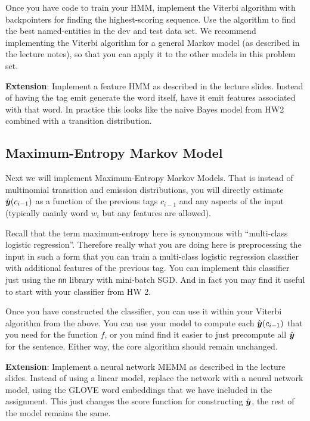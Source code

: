 \documentclass[11pt]{article}
\begin{document}
Once you have code to train your HMM, implement the Viterbi algorithm
with backpointers for finding the highest-scoring sequence. Use the
algorithm to find the best named-entities in the dev and test data
set. We recommend implementing the Viterbi algorithm for a general 
Markov model (as described in the lecture notes), so that you can 
apply it to the other models in this problem set. 

\textbf{Extension}: Implement a feature HMM as described in the
lecture slides. Instead of having the tag emit generate the word
itself, have it emit features associated with that word. In practice
this looks like the naive Bayes model from HW2 combined with a
transition distribution.


\subsection{Maximum-Entropy Markov Model}

Next we will implement Maximum-Entropy Markov Models. That is instead
of multinomial transition and emission distributions, you will
directly estimate $\hat{\boldsymbol{y}}(c_{i-1})$ as a function of the
previous tags $c_{i-1}$ and any aspects of the input (typically mainly
word $w_{i}$ but any features are allowed). 

Recall that the term maximum-entropy here is synonymous with
``multi-class logistic regression''. Therefore really what you are
doing here is preprocessing the input in such a form that you can
train a multi-class logistic regression classifier with additional
features of the previous tag. You can implement this classifier just 
using the \texttt{nn} library with mini-batch SGD. And in fact 
you may find it useful to start with your classifier from HW 2.

Once you have constructed the classifier, you can use it within your
Viterbi algorithm from the above. You can use your model to compute
each $\hat{\boldsymbol{y}}(c_{i-1})$ that you need for the function $f$, or
you mind find it easier to just precompute all $\hat{\boldsymbol{y}}$ for the 
sentence. Either way, the core algorithm should remain unchanged. 


\textbf{Extension}: Implement a neural network MEMM as described in
the lecture slides. Instead of using a linear model, replace the
network with a neural network model, using the GLOVE word embeddings
that we have included in the assignment. This just changes the score
function for constructing $\hat{\boldsymbol{y}}$, the rest of the model
remains the same.
\end{document}
